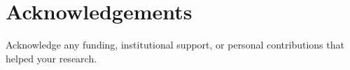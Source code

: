\documentclass[a4paper,fleqn]{cas-dc}
\begin{document}
	
	
	\section*{Acknowledgements}
	Acknowledge any funding, institutional support, or personal contributions that helped your research.
	
	
	
	
	
\end{document}
